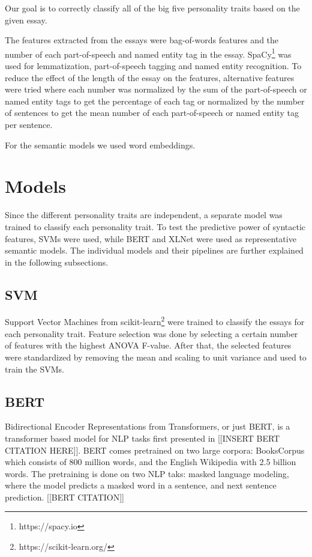 \documentclass[10pt, a4paper]{article}
\begin{document}
Our goal is to correctly classify all of the big five personality traits based on the given essay.

The features extracted from the essays were bag-of-words features and the number of each part-of-speech and named entity tag in the essay.
SpaCy\footnote{https://spacy.io} was used for lemmatization, part-of-speech tagging and named entity recognition.
To reduce the effect of the length of the essay on the features, alternative features were tried where each number was normalized by the sum of the part-of-speech or named entity tags to get the percentage of each tag or normalized by the number of sentences to get the mean number of each part-of-speech or named entity tag per sentence.

For the semantic models we used word embeddings.

\section{Models}

Since the different personality traits are independent, a separate model was trained to classify each personality trait.
To test the predictive power of syntactic features, SVMs were used, while BERT and XLNet were used as representative semantic models.
The individual models and their pipelines are further explained in the following subsections.

\subsection{SVM}

Support Vector Machines from scikit-learn\footnote{https://scikit-learn.org/} were trained to classify the essays for each personality trait.
Feature selection was done by selecting a certain number of features with the highest ANOVA F-value.
After that, the selected features were standardized by removing the mean and scaling to unit variance and used to train the SVMs.

\subsection{BERT}

Bidirectional Encoder Representations from Transformers, or just BERT, is a transformer based model for NLP tasks first presented in [[INSERT BERT CITATION HERE]]. BERT comes pretrained on two large corpora: BooksCorpus which consists of 800 million words, and the English Wikipedia with 2.5 billion words. The pretraining is done on two NLP taks: masked language modeling, where the model predicts a masked word in a sentence, and next sentence prediction. [[BERT CITATION]]
\end{document}
